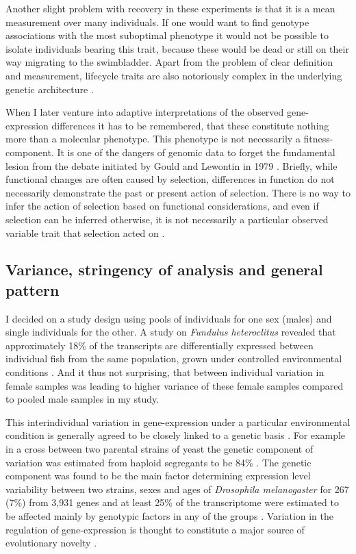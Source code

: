 Another slight problem with recovery in these experiments is that it
is a mean measurement over many individuals. If one would want to find
genotype associations with the most suboptimal phenotype it would not
be possible to isolate individuals bearing this trait, because these
would be dead or still on their way migrating to the
swimbladder. Apart from the problem of clear definition and
measurement, lifecycle traits are also notoriously complex in the
underlying genetic architecture \cite{pmid18454194}.

When I later venture into adaptive interpretations of the observed
gene-expression differences it has to be remembered, that these
constitute nothing more than a molecular phenotype. This phenotype is
not necessarily a fitness-component. It is one of the dangers of
genomic data to forget the fundamental lesion from the debate
initiated by Gould and Lewontin in 1979
\cite{gould_spandrels_1979}. Briefly, while functional changes are
often caused by selection, differences in function do not necessarily
demonstrate the past or present action of selection. There is no way
to infer the action of selection based on functional considerations,
and even if selection can be inferred otherwise, it is not necessarily
a particular observed variable trait that selection acted on
\cite{pmid19744124}.

\subsection{Variance, stringency of analysis and general pattern}
\label{sec:sample-twelve}

I decided on a study design using pools of individuals for one sex
(males) and single individuals for the other. A study on
\textit{Fundulus heteroclitus} revealed that approximately 18\% of the
transcripts are differentially expressed between individual fish from
the same population, grown under controlled environmental conditions
\cite{pmid12219088}. And it thus not surprising, that between
individual variation in female samples was leading to higher variance
of these female samples compared to pooled male samples in my study.

This interindividual variation in gene-expression under a particular
environmental condition is generally agreed to be closely linked to a
genetic basis \cite{pmid15498452}. For example in a cross between two
parental strains of yeast the genetic component of variation was
estimated from haploid segregants to be 84\% \cite{pmid11923494}. The
genetic component was found to be the main factor determining
expression level variability between two strains, sexes and ages of
\textit{Drosophila melanogaster} for 267 (7\%) from 3,931 genes and at
least 25\% of the transcriptome were estimated to be affected mainly
by genotypic factors in any of the groups
\cite{pmid11726925}. Variation in the regulation of gene-expression is
thought to constitute a major source of evolutionary novelty
\cite{pmid11341673}.

